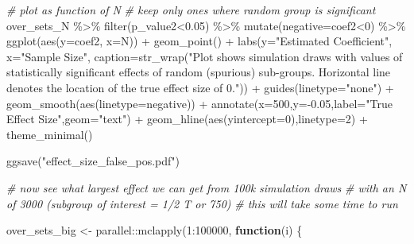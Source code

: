 \documentclass[12pt, letterpaper]{article}
\newenvironment{Shaded}{\begin{snugshade}}{\end{snugshade}}
\newcommand{\AttributeTok}[1]{\textcolor[rgb]{0.77,0.63,0.00}{#1}}
\newcommand{\CommentTok}[1]{\textcolor[rgb]{0.56,0.35,0.01}{\textit{#1}}}
\newcommand{\ControlFlowTok}[1]{\textcolor[rgb]{0.13,0.29,0.53}{\textbf{#1}}}
\newcommand{\DecValTok}[1]{\textcolor[rgb]{0.00,0.00,0.81}{#1}}
\newcommand{\FloatTok}[1]{\textcolor[rgb]{0.00,0.00,0.81}{#1}}
\newcommand{\FunctionTok}[1]{\textcolor[rgb]{0.00,0.00,0.00}{#1}}
\newcommand{\NormalTok}[1]{#1}
\newcommand{\OtherTok}[1]{\textcolor[rgb]{0.56,0.35,0.01}{#1}}
\newcommand{\SpecialCharTok}[1]{\textcolor[rgb]{0.00,0.00,0.00}{#1}}
\newcommand{\StringTok}[1]{\textcolor[rgb]{0.31,0.60,0.02}{#1}}
\begin{document}
\begin{Shaded}
\begin{Highlighting}[]
\CommentTok{\# plot as function of N}
\CommentTok{\# keep only ones where random group is significant}
\NormalTok{over\_sets\_N }\SpecialCharTok{\%\textgreater{}\%} 
  \FunctionTok{filter}\NormalTok{(p\_value2}\SpecialCharTok{\textless{}}\FloatTok{0.05}\NormalTok{) }\SpecialCharTok{\%\textgreater{}\%} 
  \FunctionTok{mutate}\NormalTok{(}\AttributeTok{negative=}\NormalTok{coef2}\SpecialCharTok{\textless{}}\DecValTok{0}\NormalTok{) }\SpecialCharTok{\%\textgreater{}\%} 
  \FunctionTok{ggplot}\NormalTok{(}\FunctionTok{aes}\NormalTok{(}\AttributeTok{y=}\NormalTok{coef2,}
           \AttributeTok{x=}\NormalTok{N)) }\SpecialCharTok{+}
  \FunctionTok{geom\_point}\NormalTok{() }\SpecialCharTok{+}
  \FunctionTok{labs}\NormalTok{(}\AttributeTok{y=}\StringTok{"Estimated Coefficient"}\NormalTok{,}
       \AttributeTok{x=}\StringTok{"Sample Size"}\NormalTok{,}
       \AttributeTok{caption=}\FunctionTok{str\_wrap}\NormalTok{(}\StringTok{"Plot shows simulation draws with values of statistically significant effects of random (spurious) sub{-}groups. Horizontal line denotes the location of the true effect size of 0."}\NormalTok{)) }\SpecialCharTok{+}
  \FunctionTok{guides}\NormalTok{(}\AttributeTok{linetype=}\StringTok{"none"}\NormalTok{) }\SpecialCharTok{+}
  \FunctionTok{geom\_smooth}\NormalTok{(}\FunctionTok{aes}\NormalTok{(}\AttributeTok{linetype=}\NormalTok{negative)) }\SpecialCharTok{+}
  \FunctionTok{annotate}\NormalTok{(}\AttributeTok{x=}\DecValTok{500}\NormalTok{,}\AttributeTok{y=}\SpecialCharTok{{-}}\FloatTok{0.05}\NormalTok{,}\AttributeTok{label=}\StringTok{"True Effect Size"}\NormalTok{,}\AttributeTok{geom=}\StringTok{"text"}\NormalTok{) }\SpecialCharTok{+}
  \FunctionTok{geom\_hline}\NormalTok{(}\FunctionTok{aes}\NormalTok{(}\AttributeTok{yintercept=}\DecValTok{0}\NormalTok{),}\AttributeTok{linetype=}\DecValTok{2}\NormalTok{) }\SpecialCharTok{+}
  \FunctionTok{theme\_minimal}\NormalTok{()}
  
\FunctionTok{ggsave}\NormalTok{(}\StringTok{"effect\_size\_false\_pos.pdf"}\NormalTok{)}

\CommentTok{\# now see what largest effect we can get from 100k simulation draws}
\CommentTok{\# with an N of 3000 (subgroup of interest = 1/2 T or 750)}
\CommentTok{\# this will take some time to run}

\NormalTok{over\_sets\_big }\OtherTok{\textless{}{-}}\NormalTok{ parallel}\SpecialCharTok{::}\FunctionTok{mclapply}\NormalTok{(}\DecValTok{1}\SpecialCharTok{:}\DecValTok{100000}\NormalTok{, }\ControlFlowTok{function}\NormalTok{(i) \{}
  

\end{Highlighting}
\end{Shaded}
\end{document}
